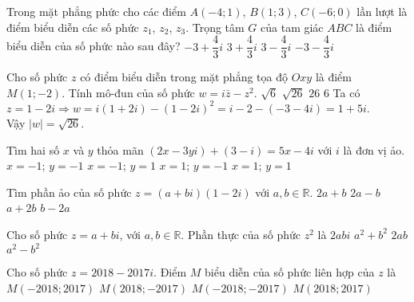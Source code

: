 \begin{ex}%
	Trong mặt phẳng phức cho các điểm $A(-4;1)$, $B(1;3)$, $C(-6;0)$ lần lượt là điểm biểu diễn các số phức $z_{1}$, $z_{2}$, $z_{3}$. Trọng tâm $G$ của tam giác $ABC$ là điểm biểu diễn của số phức nào sau đây?
	\choice
	{\True $-3+\dfrac{4}{3}i$}
	{$3+\dfrac{4}{3}i$}
	{$3-\dfrac{4}{3}i$}
	{$-3-\dfrac{4}{3}i$}
\end{ex}
\begin{ex}%
	Cho số phức $ z $	có điểm biểu diễn trong mặt phẳng tọa độ $ Oxy $ là điểm $ M(1;-2) $. Tính mô-đun của số phức $ w=i \bar{z}-z^2. $
	\choice
	{$ \sqrt{6} $}
	{\True $ \sqrt{26} $}
	{$ 26 $}
	{$ 6 $}
	\loigiai
	{Ta có $ z=1-2i \Rightarrow w=i(1+2i)-(1-2i)^2=i-2-(-3-4i)=1+5i. $\\
		Vậy $ \left|w\right|=\sqrt{26}. $
	}
\end{ex}
\begin{ex}%
	Tìm hai số $x$ và $y$ thỏa mãn $\left(2x - 3yi\right) + \left(3 - i\right) = 5x - 4i$ với $i$ là đơn vị ảo.
	\choice
	{$x = - 1$; $y = - 1$}
	{$x = - 1$; $y = 1$}
	{$x = 1$; $y = - 1$}
	{\True $x = 1$; $y = 1$}
\end{ex}
\begin{ex}%
	Tìm phần ảo của số phức $z=(a + bi)(1-2i)$ với $a,b \in \mathbb{R}$.
	\choice
	{$2a+b$}
	{$2a-b$}
	{$a+2b$}
	{\True $b-2a$}
\end{ex}
\begin{ex}%
	Cho số phức $z=a+bi$, với $a,b \in \mathbb{R}$. Phần thực của số phức $z^2$ là	
	\choice
	{$2abi$}
	{$a^2+b^2$}
	{$2ab$}
	{\True $a^2-b^2$}
\end{ex}
\begin{ex}%
	Cho số phức $z=2018-2017i$. Điểm $M$ biểu diễn của số phức liên hợp của $z$ là
	\choice
	{$M(-2018;2017)$}
	{$M(2018;-2017)$}
	{$M(-2018;-2017)$}
	{\True $M(2018;2017)$}
\end{ex}
